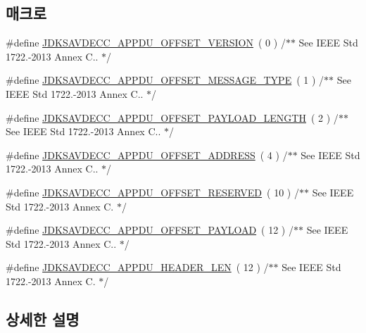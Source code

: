 \subsection*{매크로}
\begin{DoxyCompactItemize}
\item 
\#define \hyperlink{group__appdu__offset_ga57b98282f7ecf5cc47f57d7398d6f07c}{J\+D\+K\+S\+A\+V\+D\+E\+C\+C\+\_\+\+A\+P\+P\+D\+U\+\_\+\+O\+F\+F\+S\+E\+T\+\_\+\+V\+E\+R\+S\+I\+ON}~( 0 )        /$\ast$$\ast$ See I\+E\+EE Std 1722.-\/2013 Annex C.. $\ast$/
\item 
\#define \hyperlink{group__appdu__offset_ga13a78a093e9df487a35d7d57589eab98}{J\+D\+K\+S\+A\+V\+D\+E\+C\+C\+\_\+\+A\+P\+P\+D\+U\+\_\+\+O\+F\+F\+S\+E\+T\+\_\+\+M\+E\+S\+S\+A\+G\+E\+\_\+\+T\+Y\+PE}~( 1 )   /$\ast$$\ast$ See I\+E\+EE Std 1722.-\/2013 Annex C.. $\ast$/
\item 
\#define \hyperlink{group__appdu__offset_ga38243b0c214e3270829997effb1aafec}{J\+D\+K\+S\+A\+V\+D\+E\+C\+C\+\_\+\+A\+P\+P\+D\+U\+\_\+\+O\+F\+F\+S\+E\+T\+\_\+\+P\+A\+Y\+L\+O\+A\+D\+\_\+\+L\+E\+N\+G\+TH}~( 2 ) /$\ast$$\ast$ See I\+E\+EE Std 1722.-\/2013 Annex C.. $\ast$/
\item 
\#define \hyperlink{group__appdu__offset_ga15be7a53e331d7d83a0e1909abae7ae2}{J\+D\+K\+S\+A\+V\+D\+E\+C\+C\+\_\+\+A\+P\+P\+D\+U\+\_\+\+O\+F\+F\+S\+E\+T\+\_\+\+A\+D\+D\+R\+E\+SS}~( 4 )        /$\ast$$\ast$ See I\+E\+EE Std 1722.-\/2013 Annex C.. $\ast$/
\item 
\#define \hyperlink{group__appdu__offset_ga3bfdd1153365a6b7a1b8849f382a950c}{J\+D\+K\+S\+A\+V\+D\+E\+C\+C\+\_\+\+A\+P\+P\+D\+U\+\_\+\+O\+F\+F\+S\+E\+T\+\_\+\+R\+E\+S\+E\+R\+V\+ED}~( 10 )      /$\ast$$\ast$ See I\+E\+EE Std 1722.-\/2013 Annex C. $\ast$/
\item 
\#define \hyperlink{group__appdu__offset_ga8ac1754da7222c1b936a70a384b3a89d}{J\+D\+K\+S\+A\+V\+D\+E\+C\+C\+\_\+\+A\+P\+P\+D\+U\+\_\+\+O\+F\+F\+S\+E\+T\+\_\+\+P\+A\+Y\+L\+O\+AD}~( 12 )       /$\ast$$\ast$ See I\+E\+EE Std 1722.-\/2013 Annex C.. $\ast$/
\item 
\#define \hyperlink{group__appdu__offset_ga49c3326fdd0ad29a909e22f0945f2627}{J\+D\+K\+S\+A\+V\+D\+E\+C\+C\+\_\+\+A\+P\+P\+D\+U\+\_\+\+H\+E\+A\+D\+E\+R\+\_\+\+L\+EN}~( 12 )           /$\ast$$\ast$ See I\+E\+EE Std 1722.-\/2013 Annex C. $\ast$/
\end{DoxyCompactItemize}


\subsection{상세한 설명}


